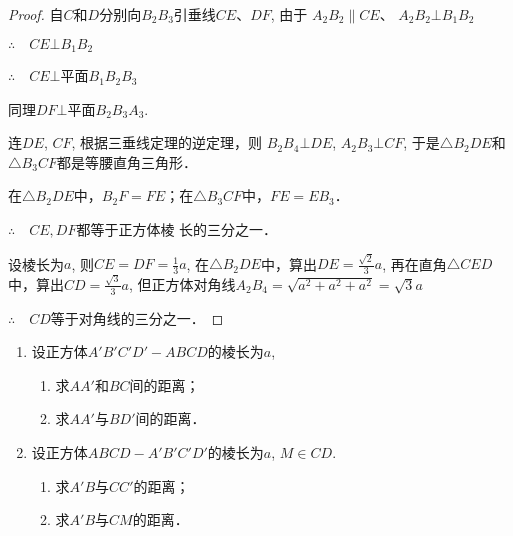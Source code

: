 \begin{proof}
  自$C$和$D$分别向$B_2B_3$引垂线$CE$、$DF$, 由于
$A_2B_2\parallel CE$、 $A_2B_2\bot B_1B_2$

$\therefore\quad CE\bot B_1B_2$

$\therefore\quad CE\bot$平面$B_1B_2B_3$

同理$DF\bot $平面$B_2B_3A_3$.

连$DE$, $CF$, 根据三垂线定理的逆定理，则
$B_2B_4\bot DE$, $A_2B_3\bot CF$, 于是$\triangle B_2DE$和$\triangle B_3CF$都是等腰直角三角形．

在$\triangle B_2DE$中，$B_2F=FE$；在$\triangle B_3CF$中，$FE=EB_3$．

$\therefore\quad CE, DF$都等于正方体棱
长的三分之一．

设棱长为$a$, 则$CE=DF=\frac{1}{3}a$, 在$\triangle B_2DE$中，算出$DE=\frac{\sqrt{2}}{3}a$, 再在直角$\triangle CED$中，算出$CD=\frac{\sqrt{3}}{3}a$, 但正方体对角线$A_2B_4=\sqrt{a^2+a^2+a^2}=\sqrt{3}a$

$\therefore\quad CD$等于对角线的三分之一．
\end{proof}

\begin{ex}
\begin{enumerate}
  \item 设正方体$A'B'C'D'-ABCD$的棱长为$a$,
\begin{enumerate}
  \item 求$AA'$和$BC$间的距离；
  \item 求$AA'$与$BD'$间的距离．
\end{enumerate}
  
  \item 设正方体$ABCD-A'B'C'D'$的棱长为$a$, $M\in CD$.
\begin{enumerate}
  \item 求$A'B$与$CC'$的距离；
  \item 求$A'B$与$CM$的距离．
\end{enumerate}
\end{enumerate}
\end{ex}


